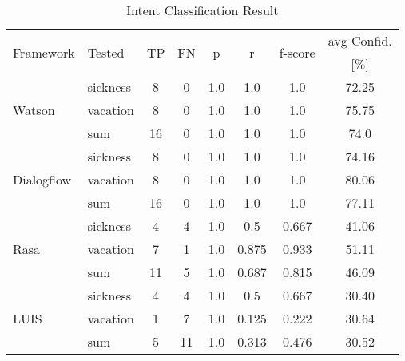 \begin{table}[h]
    \centering
    \begin{tabular}{ l | l | c | c | c | c | c | c  }
        \multirow{2}{*}{Framework} & \multirow{2}{*}{Tested} & \multirow{2}{*}{TP} & \multirow{2}{*}{FN} & \multirow{2}{*}{p} & \multirow{2}{*}{r} & \multirow{2}{*}{f-score} & avg Confid. \\ 
                 &&          &            &   & & & [\%]     \\ \hline \hline
        \multirow{3}{*}{Watson} 
        & sickness & 8 & 0& 1.0& 1.0& 1.0&72.25 \\
        & vacation & 8 & 0& 1.0& 1.0& 1.0&75.75 \\
        & sum      &16 & 0& 1.0& 1.0& 1.0&74.0  \\ \hline
        
        \multirow{3}{*}{Dialogflow} 
        & sickness & 8& 0& 1.0& 1.0& 1.0&74.16\\
        & vacation & 8& 0& 1.0& 1.0& 1.0&80.06\\
        & sum      &16& 0& 1.0& 1.0& 1.0&77.11\\ \hline

        \multirow{3}{*}{Rasa} 
        & sickness & 4& 4& 1.0& 0.5  & 0.667& 41.06\\
        & vacation & 7& 1& 1.0& 0.875& 0.933& 51.11\\
        & sum      &11& 5& 1.0& 0.687& 0.815& 46.09\\ \hline

        \multirow{3}{*}{LUIS} 
        & sickness & 4& 4& 1.0& 0.5  & 0.667& 30.40\\
        & vacation & 1& 7& 1.0& 0.125& 0.222& 30.64\\
        & sum      & 5&11& 1.0& 0.313& 0.476& 30.52\\
    \end{tabular}
    \caption{Intent Classification Result} \label{tab:intent_classification_result}
\end{table} \noindent

